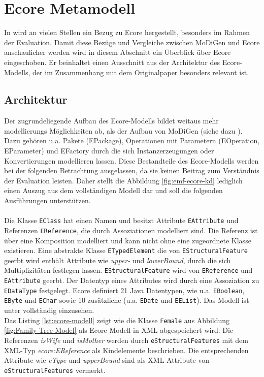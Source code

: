 \section{Ecore Metamodell}
In \cite{gerhart2015approach} wird an vielen Stellen ein Bezug zu Ecore hergestellt, besonders im Rahmen der Evaluation. Damit diese Bezüge und Vergleiche zwischen MoDiGen und Ecore anschaulicher werden wird in diesem Abschnitt ein Überblick über Ecore eingeschoben. Er beinhaltet einen Ausschnitt aus der Architektur des Ecore-Modells, der im Zusammenhang mit dem Originalpaper besonders relevant ist.

\subsection{Architektur}
Der zugrundeliegende Aufbau des Ecore-Modells bildet weitaus mehr modellierungs Möglichkeiten ab, als der Aufbau von MoDiGen (siehe dazu \cite{eclipse_ecore}). Dazu gehören u.a. Pakete (EPackage), Operationen mit Parametern (EOperation, EParameter) und EFactory durch die sich Instanzerzeugungen oder Konvertierungen modellieren lassen. Diese Bestandteile des Ecore-Modells werden bei der folgenden Betrachtung ausgelassen, da sie keinen Beitrag zum Verständnis der Evaluation  leisten. Daher stellt die Abbildung \ref{fig:emf-ecore-kd} lediglich einen Auszug aus dem vollständigen Modell dar und soll die folgenden Ausführungen unterstützen.\\
\\
Die Klasse \texttt{EClass} hat einen Namen und besitzt Attribute \texttt{EAttribute} und Referenzen \texttt{EReference}, die durch Assoziationen modelliert sind. Die Referenz ist über eine Komposition modelliert und kann nicht ohne eine zugeordnete Klasse existieren. Eine abstrakte Klasse \texttt{ETypedElement} die von \texttt{EStructuralFeature} geerbt wird enth\"alt Attribute wie \textit{upper-} und \textit{lowerBound}, durch die sich Multiplizitäten festlegen lassen. \texttt{EStructuralFeature} wird von \texttt{EReference} und \texttt{EAttribute} geerbt. Der Datentyp eines Attributes wird durch eine Assoziation zu \texttt{EDataType} festgelegt. Ecore definiert 21 Java Datentypen, wie u.a. \texttt{EBoolean}, \texttt{EByte} und \texttt{EChar} sowie 10 zus\"atzliche (u.a. \texttt{EDate} und \texttt{EEList}). Das Modell ist unter \cite{eclipse_ecore} vollst\"andig einzusehen.\\



Das Listing \ref{lst:ecore-modell} zeigt wie die Klasse \texttt{Female} aus Abbildung \ref{fig:Family-Tree-Model} als Ecore-Modell in XML abgespeichert wird. Die Referenzen \textit{isWife} und \textit{isMother} werden durch \texttt{eStructuralFeatures} mit dem XML-Typ \textit{ecore:EReference} als Kindelemente beschrieben. Die entsprechenden Attribute wie \textit{eType} und \textit{upperBound} sind als XML-Attribute von \texttt{eStructuralFeatures} vermerkt.


